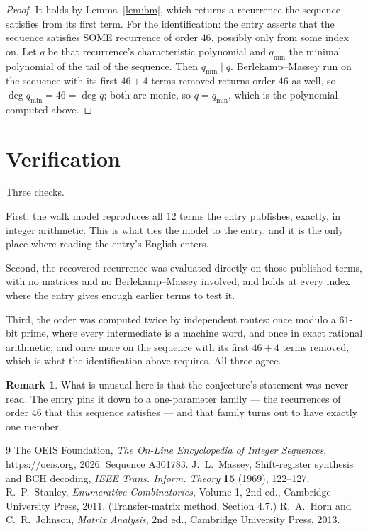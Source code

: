 \documentclass[11pt,a4paper]{article}
\theoremstyle{plain}
\theoremstyle{definition}
\newtheorem{remark}[theorem]{Remark}
\begin{document}
\begin{proof}
It holds by Lemma~\ref{lem:bm}, which returns a recurrence the sequence satisfies from its
first term. For the identification: the entry asserts that the sequence satisfies SOME
recurrence of order $46$, possibly only from some index on. Let $q$ be that recurrence's
characteristic polynomial and $q_{\min}$ the minimal polynomial of the tail of the sequence.
Then $q_{\min}\mid q$. Berlekamp--Massey run on the sequence with its first $46+4$ terms
removed returns order $46$ as well, so $\deg q_{\min}=46=\deg q$; both are monic, so
$q=q_{\min}$, which is the polynomial computed above.
\end{proof}

\section{Verification}

Three checks.

First, the walk model reproduces all $12$ terms the entry publishes, exactly, in integer
arithmetic. This is what ties the model to the entry, and it is the only place where reading
the entry's English enters.

Second, the recovered recurrence was evaluated directly on those published terms, with no
matrices and no Berlekamp--Massey involved, and holds at every index where the entry gives
enough earlier terms to test it.

Third, the order was computed twice by independent routes: once modulo a $61$-bit prime, where
every intermediate is a machine word, and once in exact rational arithmetic; and once more on
the sequence with its first $46+4$ terms removed, which is what the identification above
requires. All three agree.

\begin{remark}
What is unusual here is that the conjecture's statement was never read. The entry pins it down
to a one-parameter family --- the recurrences of order $46$ that this sequence satisfies
--- and that family turns out to have exactly one member.
\end{remark}

\begin{thebibliography}{9}
 The OEIS Foundation, \emph{The On-Line Encyclopedia of Integer
Sequences}, \url{https://oeis.org}, 2026. Sequence A301783.
 J.~L.~Massey, Shift-register synthesis and BCH decoding, \emph{IEEE
Trans. Inform. Theory} \textbf{15} (1969), 122--127.
 R.~P.~Stanley, \emph{Enumerative Combinatorics}, Volume 1, 2nd ed.,
Cambridge University Press, 2011. (Transfer-matrix method, Section 4.7.)
 R.~A.~Horn and C.~R.~Johnson, \emph{Matrix Analysis}, 2nd ed., Cambridge
University Press, 2013.
\end{thebibliography}
\end{document}
